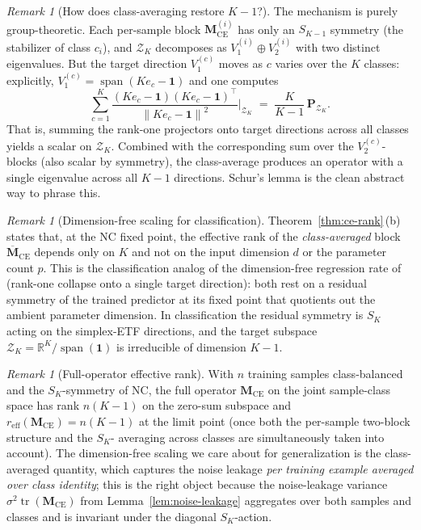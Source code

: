 \documentclass[12pt]{amsart}
\theoremstyle{definition}
\theoremstyle{remark}
\newtheorem{remark}[theorem]{Remark}
\DeclareMathOperator{\tr}{tr}
\DeclareMathOperator{\spn}{span}
\newcommand{\R}{\mathbb{R}}
\newcommand{\bM}{\mathbf{M}}
\newcommand{\bP}{\mathbf{P}}
\newcommand{\norm}[1]{\left\lVert #1 \right\rVert}
\begin{document}
\begin{remark}[How does class-averaging restore $K-1$?]\label{rem:averaging}
The mechanism is purely group-theoretic. Each per-sample block
$\bM_{\mathrm{CE}}^{(i)}$ has only an $S_{K-1}$ symmetry (the
stabilizer of class $c_{i}$), and $\mathcal{Z}_{K}$ decomposes as
$V_{1}^{(i)} \oplus V_{2}^{(i)}$ with two distinct eigenvalues.
But the target direction $V_{1}^{(c)}$ moves as $c$ varies over the
$K$ classes: explicitly, $V_{1}^{(c)} = \spn(K e_{c} - \mathbf{1})$
and one computes
\[
  \sum_{c=1}^{K}
  \frac{(K e_{c} - \mathbf{1})(K e_{c} - \mathbf{1})^{\top}}{\norm{Ke_{c} - \mathbf{1}}^{2}}
  \Bigg|_{\mathcal{Z}_{K}}
  \;=\; \frac{K}{K-1}\,\bP_{\mathcal{Z}_{K}}.
\]
That is, summing the rank-one projectors onto target directions
across all classes yields a scalar on $\mathcal{Z}_{K}$. Combined
with the corresponding sum over the $V_{2}^{(c)}$-blocks (also
scalar by symmetry), the class-average produces an operator with a
single eigenvalue across all $K-1$ directions. Schur's lemma is the
clean abstract way to phrase this.
\end{remark}

\begin{remark}[Dimension-free scaling for
classification]\label{rem:dim-free}
Theorem~\ref{thm:ce-rank}\,(b) states that, at the NC fixed point,
the effective rank of the \emph{class-averaged} block
$\overline{\bM}_{\mathrm{CE}}$ depends only on $K$ and not on the
input dimension $d$ or the parameter count $p$. This is the
classification analog of the dimension-free regression rate of
\cite{paperC} (rank-one collapse onto a single target direction):
both rest on a residual symmetry of the trained predictor at its
fixed point that quotients out the ambient parameter dimension. In
classification the residual symmetry is $S_{K}$ acting on the
simplex-ETF directions, and the target subspace
$\mathcal{Z}_{K} = \R^{K}/\spn(\mathbf{1})$ is irreducible of
dimension $K-1$.
\end{remark}

\begin{remark}[Full-operator effective rank]\label{rem:full-vs-per-sample}
With $n$ training samples class-balanced and the $S_{K}$-symmetry
of NC, the full operator $\bM_{\mathrm{CE}}$ on the joint
sample-class space has rank $n(K-1)$ on the zero-sum subspace and
$r_{\mathrm{eff}}(\bM_{\mathrm{CE}}) = n(K-1)$ at the limit point
(once both the per-sample two-block structure and the $S_{K}$-
averaging across classes are simultaneously taken into account).
The dimension-free scaling we care about for generalization is the
class-averaged quantity, which captures the noise leakage \emph{per
training example averaged over class identity}; this is the right
object because the noise-leakage variance
$\sigma^{2}\tr(\bM_{\mathrm{CE}})$ from
Lemma~\ref{lem:noise-leakage} aggregates over both samples and
classes and is invariant under the diagonal $S_{K}$-action.
\end{remark}
\end{document}
